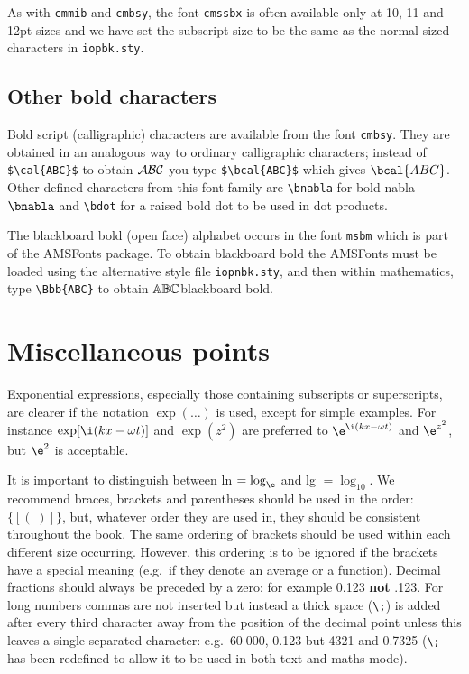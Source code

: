 As with \verb"cmmib" and \verb"cmbsy",
the font \verb"cmssbx" is often available only at 10, 11 
and 12pt sizes and we have set the subscript size to be the same as the 
normal sized characters in \verb"iopbk.sty". 


\subsection{Other bold characters}
Bold script (calligraphic)
characters are available from the font \verb"cmbsy". They are obtained in
an analogous way to ordinary calligraphic characters;
instead of \verb"$\cal{ABC}$" to obtain $\cal{ABC}$ you type 
\verb"$\bcal{ABC}$" which gives $\bcal{ABC}$. Other defined characters 
from this font family are \hbox{\verb"\bnabla"} for bold nabla $\bnabla$
and \verb"\bdot" for a raised bold dot to be used in dot products.



The blackboard bold 
(open face) alphabet occurs in the font \verb"msbm" 
which is part of the AMSFonts package. To obtain blackboard bold the 
AMSFonts must be loaded using the alternative style file
\verb"iopnbk.sty",
and then within mathematics, type 
\verb"\Bbb{ABC}" to obtain \ifnbk  $\Bbb{ABC}$\else blackboard bold\fi. 


\section{Miscellaneous points}
Exponential expressions, especially those containing subscripts or 
superscripts, are clearer if the notation $\exp(\ldots)$ is used, 
except for 
simple examples. 
For instance $\exp[\i(kx-\omega t)]$ and $\exp(z^2)$ are 
preferred to $\e^{\i(kx-\omega t)}$ and $\e^{z^2}$, but 
$\e^2$ 
is acceptable. 

It is important to distinguish between ln $= \log_\e$ and lg 
$=\log_{10}$. We recommend braces, brackets and 
parentheses should be used in the 
order: $\{[(\;)]\}$, but, whatever order they are 
used in, they should be consistent throughout the book. 
The same ordering of brackets should be 
used within each different size occurring. 
However, this ordering is to be ignored if the
brackets have a 
special meaning (e.g.\ if they denote an average or a function). Decimal 
fractions should 
always be preceded by a zero: for example 0.123 {\bf not} .123. For long 
numbers commas are not inserted but instead a thick space (\verb"\;")
is added after 
every third character away from the position of the decimal point unless 
this leaves a single separated character: e.g.\ $60\;000$, 
0.123 
but 4321 and 0.7325 (\verb"\;" has been redefined to allow it to be 
used in both text and maths mode).

